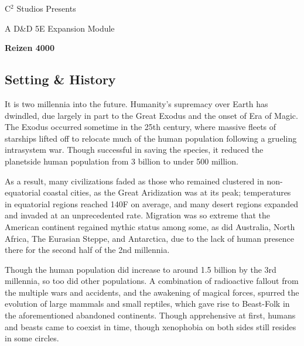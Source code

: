 \documentclass[12pt, landscape]{article}
\begin{document}
	\begin{Center}
		\large
		C$^2$ Studios Presents

		\Large
		A D\&D 5E Expansion Module

		\LARGE
		\textbf{Reizen 4000}
	\end{Center}

	\begin{FlushLeft}
		\small
		\begin{multicols}{2}
			\tableofcontents
		\end{multicols}
		\pagebreak

		\begin{multicols}{3}
			\section{Setting \& History}
			It is two millennia into the future. Humanity’s supremacy over Earth has dwindled, due largely in part to the Great Exodus and the onset of Era of Magic. The Exodus occurred sometime in the 25th century, where massive fleets of starships lifted off to relocate much of the human population following a grueling intrasystem war. Though successful in saving the species, it reduced the planetside human population from 3 billion to under 500 million. \linebreak

			As a result, many civilizations faded as those who remained clustered in non-equatorial coastal cities, as the Great Aridization was at its peak; temperatures in equatorial regions reached 140F on average, and many desert regions expanded and invaded at an unprecedented rate. Migration was so extreme that the American continent regained mythic status among some, as did Australia, North Africa, The Eurasian Steppe, and Antarctica, due to the lack of human presence there for the second half of the 2nd millennia. \vfill \null \columnbreak

			Though the human population did increase to around 1.5 billion by the 3rd millennia, so too did other populations. A combination of radioactive fallout from the multiple wars and accidents, and the awakening of magical forces, spurred the evolution of large mammals and small reptiles, which gave rise to Beast-Folk in the aforementioned abandoned continents. Though apprehensive at first, humans and beasts came to coexist in time, though xenophobia on both sides still resides in some circles. \linebreak


\end{multicols}
\end{FlushLeft}
\end{document}
